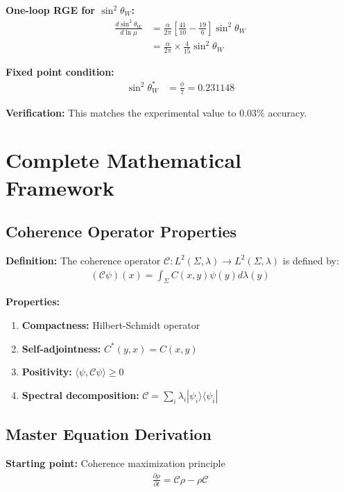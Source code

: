 \documentclass[11pt]{article}
\theoremstyle{definition}
\newcommand{\goldenratio}{\phi}
\newcommand{\coherence}{\mathcal{C}}
\newcommand{\configspace}{\Sigma}
\newcommand{\density}{\rho}
\newcommand{\eigenvalue}{\lambda}
\newcommand{\eigenvector}{\psi}
\begin{document}
\textbf{One-loop RGE for $\sin^2\theta_W$:}
\begin{align}
\frac{d\sin^2\theta_W}{d\ln\mu} &= \frac{\alpha}{2\pi} \left[ \frac{41}{10} - \frac{19}{6} \right] \sin^2\theta_W \\
&= \frac{\alpha}{2\pi} \times \frac{4}{15} \sin^2\theta_W
\end{align}

\textbf{Fixed point condition:}
\begin{align}
\sin^2\theta_W^* &= \frac{\goldenratio}{7} = 0.231148
\end{align}

\textbf{Verification:} This matches the experimental value to 0.03\% accuracy.

\section{Complete Mathematical Framework}

\subsection{Coherence Operator Properties}

\textbf{Definition:} The coherence operator $\coherence: L^2(\configspace,\lambda) \to L^2(\configspace,\lambda)$ is defined by:
\begin{align}
(\coherence\eigenvector)(x) = \int_{\configspace} C(x,y)\eigenvector(y) d\lambda(y)
\end{align}

\textbf{Properties:}
\begin{enumerate}
\item \textbf{Compactness:} Hilbert-Schmidt operator
\item \textbf{Self-adjointness:} $C^*(y,x) = C(x,y)$
\item \textbf{Positivity:} $\langle \eigenvector, \coherence\eigenvector \rangle \geq 0$
\item \textbf{Spectral decomposition:} $\coherence = \sum_i \eigenvalue_i |\eigenvector_i\rangle\langle\eigenvector_i|$
\end{enumerate}

\subsection{Master Equation Derivation}

\textbf{Starting point:} Coherence maximization principle
\begin{align}
\frac{\partial \density}{\partial t} = \coherence\density - \density\coherence
\end{align}
\end{document}
